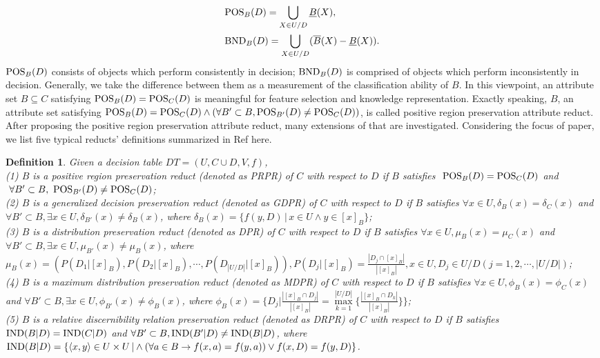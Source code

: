 \documentclass[review]{elsarticle}
\newtheorem*{OtherDef}{Definition}
\begin{document}
		\begin{equation*}\begin{split}
			&{\rm POS}_B(D) = \bigcup_{X \in U/D}\underline{B}(X),\\
			&{\rm BND}_B(D)=\bigcup_{X \in U/D} (\overline{B}(X)-\underline{B}(X)).
		\end{split}\end{equation*}
	${\rm POS}_B(D)$ consists of objects which perform consistently in decision; ${\rm BND}_B(D)$ is comprised of objects which perform inconsistently in decision. Generally,  we take the difference between them as a measurement of the classification ability of $B$. In this viewpoint, an attribute set $B \subseteq C$ satisfying ${\rm POS}_B(D)={\rm POS}_C(D)$ is meaningful for feature selection and knowledge representation. Exactly speaking, $B$, an attribute set satisfying ${\rm POS}_B(D)={\rm POS}_C(D) \wedge (\forall B' \subset B, {\rm POS}_{B'}(D)\neq {\rm POS}_C(D))$, is called positive region preservation attribute reduct. After proposing the positive region preservation attribute reduct, many extensions of that are investigated. Considering the focus of paper, we list five typical reducts' definitions summarized in Ref \cite{zhou2011analysis} here. \begin{OtherDef}
		Given a decision table $DT=(U,C \cup D,V,f)$,\\
		{\rm(1)} $B$ is a positive region preservation reduct (denoted as PRPR) of $C$ with respect to $D$ if $B$ satisfies $\ {\rm POS}_B(D)={\rm POS}_C(D)$ and $\ \forall B' \subset B,\ {\rm POS}_{B'}(D) \neq {\rm POS}_{C}(D)$;\\
		{\rm(2)} $B$ is a generalized decision preservation reduct (denoted as GDPR) of $C$ with respect to $D$ if $B$ satisfies $\forall x\in U, \delta_{B}(x)=\delta_{C}(x)$ and $\forall B' \subset B, \exists x \in U, \delta_{B'}(x) \neq \delta_{B}(x)$, where $\delta_{B}(x)=\{f(y,D)\,|\, x \in U \wedge y \in [x]_B\}$;\\
		{\rm(3)} $B$ is a distribution preservation reduct (denoted as DPR) of $C$ with respect to $D$ if $B$ satisfies $ \forall x\in U, \mu_{B}(x)=\mu_{C}(x)$ and $\forall B' \subset B, \exists x \in U, \mu_{B'}(x) \neq \mu_{B}(x)$, where $\mu_{B}(x)=(P(D_1|[x]_B),P(D_2|[x]_B),\cdots,P(D_{|U/D|}|[x]_B)),P(D_j|[x]_B)=\frac{|D_j \cap [x]_B|}{|[x]_B|}, x \in U, D_j \in U/D(j=1,2,\cdots,|U/D|)$;\\
		{\rm(4)} $B$ is a maximum distribution preservation reduct (denoted as MDPR) of $C$ with respect to $D$ if $B$ satisfies $\forall x \in U, \phi_{B}(x)=\phi_{C}(x)$ and $\forall B' \subset B, \exists x \in U, \phi_{B'}(x) \neq \phi_{B}(x)$, where $\phi_{B}(x)=\{D_{j}|\frac{|[x]_B \cap D_{j}|}{|[x]_{B}|}=\max\limits_{k=1}^{|U/D|}\{\frac{|[x]_B \cap D_{k}|}{|[x]_{B}|}\}\}$;\\
		{\rm(5)} $B$ is a relative discernibility relation preservation reduct (denoted as DRPR) of $C$ with respect to $D$ if $B$ satisfies
		${\rm IND}(B|D)={\rm IND}(C|D)$ and $\forall B' \subset B, {\rm IND}(B'|D) \neq {\rm IND}(B|D)$, where ${\rm IND}(B|D)=\{\langle x,y \rangle \in U \times U \,| \wedge (\forall a \in B \rightarrow f(x,a)=f(y,a)) \vee f(x,D)=f(y,D)\}$. 
	\end{OtherDef}
\end{document}
